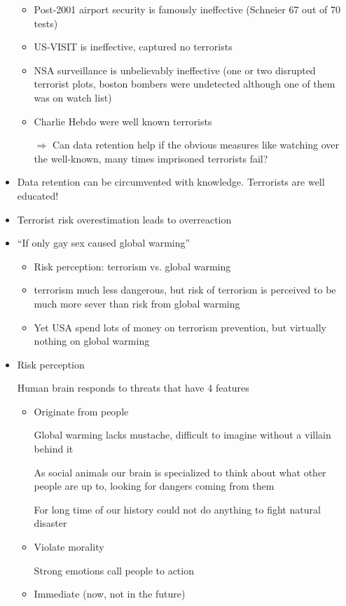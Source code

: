 \documentclass[a4paper,12pt]{scrartcl}
\begin{document}
\begin{itemize}
\begin{itemize}
			\item
				Post-2001 airport security is famously ineffective (Schneier 67 out of 70 tests)
			\item
				US-VISIT is ineffective, captured no terrorists
			\item
				NSA surveillance is unbelievably ineffective (one or two disrupted terrorist plots, boston bombers were undetected although one of them was on watch list)
			\item
				Charlie Hebdo were well known terrorists
			\item[$\Rightarrow$] Can data retention help if the obvious measures like watching over the well-known, many times imprisoned terrorists fail?
		\end{itemize}
	\item
		Data retention can be circumvented with knowledge. Terrorists are well educated!
	\item
		Terrorist risk overestimation leads to  overreaction
	\item
		\enquote{If only gay sex caused global warming}
		\begin{itemize}
			\item
				Risk perception: terrorism vs. global warming
			\item
				terrorism much less dangerous, but risk of terrorism is perceived to be much more sever than risk from global warming
			\item
				Yet USA spend lots of money on terrorism prevention, but virtually nothing on global warming

		\end{itemize}
	\item
		Risk perception

		Human brain responds to threats that have 4 features
		\begin{itemize}
			\item
				Originate from people

				Global warming lacks mustache, difficult to imagine without a villain behind it

				As social animals our brain is specialized to think about what other people are up to, looking for dangers coming from them

				For long time of our history could not do anything to fight natural disaster
			\item
				Violate morality

				Strong emotions call people to action
			\item
				Immediate (now, not in the future)


\end{itemize}
\end{itemize}
\end{document}
